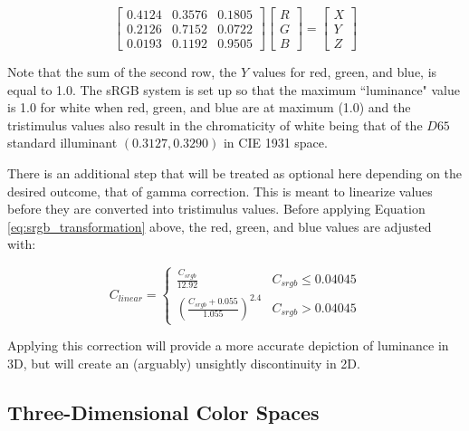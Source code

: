 \documentclass{article}
\begin{document}
\begin{multicols}{2}
\begin{equation}\label{eq:srgb_transformation} %
    \begin{bmatrix}
        0.4124&0.3576&0.1805\\
        0.2126&0.7152&0.0722\\
        0.0193&0.1192&0.9505
    \end{bmatrix}\begin{bmatrix}
        R\\
        G\\
        B
    \end{bmatrix}=\begin{bmatrix}
        X\\
        Y\\
        Z
    \end{bmatrix}
\end{equation}

Note that the sum of the second row, the $Y$ values for red, green, and blue, is equal to 1.0.  The sRGB system is set up so that the maximum ``luminance" value is 1.0 for white when red, green, and blue are at maximum (1.0) and the tristimulus values also result in the chromaticity of white being that of the $D65$ standard illuminant $(0.3127,0.3290)$ in CIE 1931 space.

There is an additional step that will be treated as optional here depending on the desired outcome, that of gamma correction.  This is meant to linearize values before they are converted into tristimulus values.  Before applying Equation \ref{eq:srgb_transformation} above, the red, green, and blue values are adjusted with:

\begin{equation}\label{eq:gamma_correction} %
    C_{linear}=\left\{\begin{array}{ll}
        \frac{C_{srgb}}{12.92}&C_{srgb}\leq0.04045\\
        \left(\frac{C_{srgb}+0.055}{1.055}\right)^{2.4}&C_{srgb}>0.04045
    \end{array}\right.
\end{equation}

Applying this correction will provide a more accurate depiction of luminance in 3D, but will create an (arguably) unsightly discontinuity in 2D.

\subsection{Three-Dimensional Color Spaces} %


\end{multicols}
\end{document}
